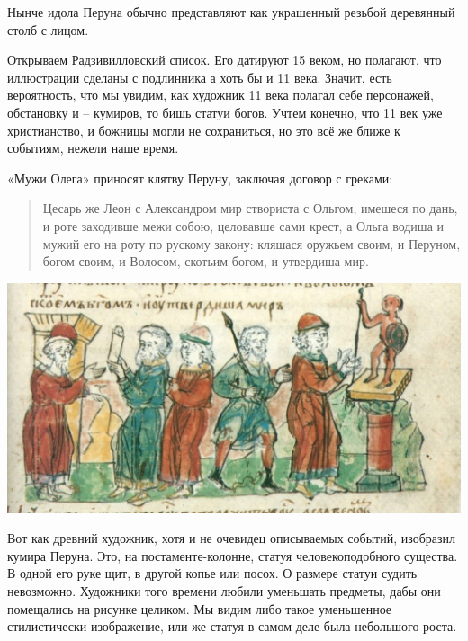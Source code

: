 
Нынче идола Перуна обычно представляют как украшенный резьбой деревянный столб с лицом. 

Открываем Радзивилловский список. Его датируют 15 веком, но полагают, что иллюстрации сделаны с подлинника а хоть бы и 11 века. Значит, есть вероятность, что мы увидим, как художник 11 века полагал себе персонажей, обстановку и – кумиров, то бишь статуи богов. Учтем конечно, что 11 век уже христианство, и божницы могли не сохраниться, но это всё же ближе к событиям, нежели наше время.

«Мужи Олега» приносят клятву Перуну, заключая договор с греками:

\begin{quotation}
Цесарь же Леон с Александром мир створиста с Ольгом, имешеся по дань, и роте заходивше межи собою, целовавше сами крест, а Ольга водиша и мужий его на роту по рускому закону: кляшася оружьем своим, и Перуном, богом своим, и Волосом, скотьим богом, и утвердиша мир.
\end{quotation}


\begin{center}
\includegraphics[width=\linewidth]{chast-zmiy/ktotakiezmei/rad-perun-01.jpg}
\end{center}

Вот как древний художник, хотя и не очевидец описываемых событий, изобразил кумира Перуна. Это, на постаменте-колонне, статуя человекоподобного существа. В одной его руке щит, в другой копье или посох. О размере статуи судить невозможно. Художники того времени любили уменьшать предметы, дабы они помещались на рисунке целиком. Мы видим либо такое уменьшенное стилистически изображение, или же статуя в самом деле была небольшого роста.

